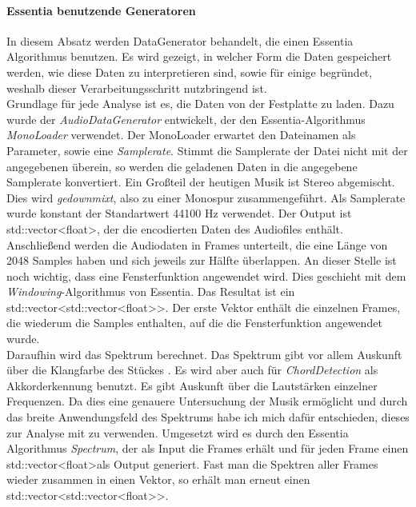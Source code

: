 \documentclass[11pt,a4paper]{article}
\begin{document}
\paragraph{Essentia benutzende Generatoren}
In diesem Absatz werden DataGenerator behandelt, die einen Essentia Algorithmus benutzen. Es wird gezeigt, in welcher Form die Daten gespeichert werden, wie diese Daten zu interpretieren sind, sowie für einige begründet, weshalb dieser Verarbeitungsschritt nutzbringend ist.\\
Grundlage für jede Analyse ist es, die Daten von der Festplatte zu laden. Dazu wurde der \textit{AudioDataGenerator} entwickelt, der den Essentia-Algorithmus \textit{MonoLoader} verwendet. Der MonoLoader erwartet den Dateinamen als Parameter, sowie eine \textit{Samplerate}. Stimmt die Samplerate der Datei nicht mit der angegebenen überein, so werden die geladenen Daten in die angegebene Samplerate konvertiert. Ein Großteil der heutigen Musik ist Stereo abgemischt. Dies wird \textit{gedownmixt}, also zu einer Monospur zusammengeführt. Als Samplerate wurde konstant der Standartwert 44100 Hz verwendet. Der Output ist std::vector\textless float\textgreater , der die encodierten Daten des Audiofiles enthält.\\
Anschließend werden die Audiodaten in Frames unterteilt, die eine Länge von 2048 Samples haben und sich jeweils zur Hälfte überlappen. An dieser Stelle ist noch wichtig, dass eine Fensterfunktion angewendet wird. Dies geschieht mit dem \textit{Windowing}-Algorithmus von Essentia. Das Resultat ist ein std::vector\textless std::vector\textless float\textgreater\text{}\textgreater . Der erste Vektor enthält die einzelnen Frames, die wiederum die Samples enthalten, auf die die Fensterfunktion angewendet wurde.\\
Daraufhin wird das Spektrum berechnet. Das Spektrum gibt vor allem Auskunft über die Klangfarbe des Stückes \cite[S. 41]{lerch2012introduction}. Es wird aber auch für \textit{ChordDetection} als Akkorderkennung benutzt. Es gibt Auskunft über die Lautstärken einzelner Frequenzen. Da dies eine genauere Untersuchung der Musik ermöglicht und durch das breite Anwendungsfeld des Spektrums habe ich mich dafür entschieden, dieses zur Analyse mit zu verwenden. Umgesetzt wird es durch den Essentia Algorithmus \textit{Spectrum}, der als Input die Frames erhält und für jeden Frame einen std::vector\textless float\textgreater als Output generiert. Fast man die Spektren aller Frames wieder zusammen in einen Vektor, so erhält man erneut einen std::vector\textless std::vector\textless float\textgreater\text{}\textgreater .\\
\end{document}
